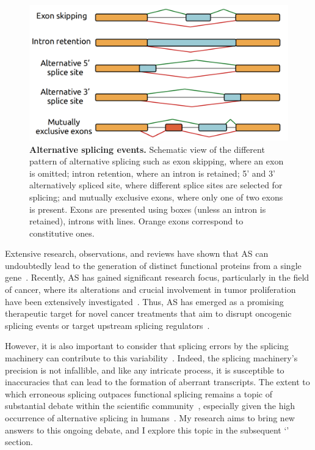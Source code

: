 \begin{figure}[ht]
    \centering
    \includegraphics[width=0.7\linewidth]{figures/as_events.png}
    \caption[Alternative splicing events]{\textbf{Alternative splicing events.} Schematic view of the different pattern of alternative splicing such as exon skipping, where an exon is omitted; intron retention, where an intron is retained; 5' and 3' alternatively spliced site, where different splice sites are selected for splicing; and mutually exclusive exons, where only one of two exons is present. Exons are presented using boxes (unless an intron is retained), introns with lines. Orange exons correspond to constitutive ones.\newline}
    \label{fig:asevents}
\end{figure}

Extensive research, observations, and reviews have shown that \acrshort{AS} can undoubtedly lead to the generation of distinct functional proteins from a single gene~\citep{blencowe_alternative_2006, ule_alternative_2019, wright_alternative_2022, verta_role_2022, singh_importance_2022}. Recently, AS has gained significant research focus, particularly in the field of cancer, where its alterations and crucial involvement in tumor proliferation have been extensively investigated~\citep{anczukow_splicing-factor_2016, bonnal_roles_2020, qi_significance_2020}. Thus, \acrshort{AS} has emerged as a promising therapeutic target for novel cancer treatments that aim to disrupt oncogenic splicing events or target upstream splicing regulators~\citep{sciarrillo_role_2020}.

However, it is also important to consider that splicing errors by the splicing machinery can contribute to this variability~\citep{pickrell_noisy_2010, rajon_evolution_2011, xu_alternative_2018, saudemont_fitness_2017}. Indeed, the splicing machinery's precision is not infallible, and like any intricate process, it is susceptible to inaccuracies that can lead to the formation of aberrant transcripts. The extent to which erroneous splicing outpaces functional splicing remains a topic of substantial debate within the scientific community~\citep{tress_alternative_2017, blencowe_relationship_2017, tress_most_2017}, especially given the high occurrence of alternative splicing in humans~\citep{pan_deep_2008}. My research aims to bring new answers to this ongoing debate, and I explore this topic in the subsequent `' section.



